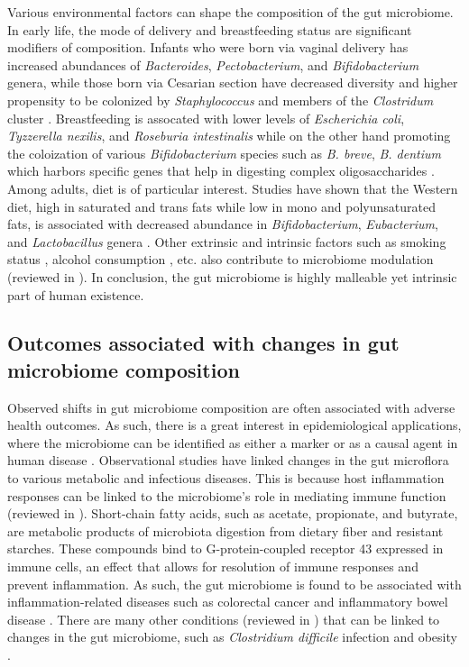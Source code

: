 Various environmental factors can shape the composition of the gut microbiome. In early life, the mode of delivery and breastfeeding status are significant modifiers of composition. Infants who were born via vaginal delivery has increased abundances of \emph{Bacteroides}, \emph{Pectobacterium}, and \emph{Bifidobacterium} genera, while those born via Cesarian section have decreased diversity and higher propensity to be colonized by \emph{Staphylococcus} and members of the \emph{Clostridum} cluster \cite{madan2016effects, kim2020delayed, stewart2018temporal}. Breastfeeding is assocated with lower levels of \emph{Escherichia coli}, \emph{Tyzzerella nexilis}, and \emph{Roseburia intestinalis} while on the other hand promoting the coloization of various \emph{Bifidobacterium} species such as \emph{B. breve}, \emph{B. dentium} which harbors specific genes that help in digesting complex oligosaccharides \cite{stewart2018temporal, vatanen2018human}. Among adults, diet is of particular interest. Studies have shown that the Western diet, high in saturated and trans fats while low in mono and polyunsaturated fats, is associated with decreased abundance in \emph{Bifidobacterium}, \emph{Eubacterium}, and \emph{Lactobacillus} genera \cite{wu2011linking}. Other extrinsic and intrinsic factors such as smoking status \cite{biedermann2013smoking}, alcohol consumption \cite{dubinkina2017links}, etc. also contribute to microbiome modulation (reviewed in \cite{schmidt2018humana}). In conclusion, the gut microbiome is highly malleable yet intrinsic part of human existence. 

\subsection{Outcomes associated with changes in gut microbiome composition}

Observed shifts in gut microbiome composition are often associated with adverse health outcomes. As such, there is a great interest in epidemiological applications, where the microbiome can be identified as either a marker or as a causal agent in human disease \cite{foxman2015use}. Observational studies have linked changes in the gut microflora to various metabolic and infectious diseases. This is because host inflammation responses can be linked to the microbiome's role in mediating immune function (reviewed in \cite{wang2020relationship}). Short-chain fatty acids, such as acetate, propionate, and butyrate, are metabolic products of microbiota digestion from dietary fiber and resistant starches. These compounds bind to G-protein-coupled receptor 43 expressed in immune cells, an effect that allows for resolution of immune responses and prevent inflammation. As such, the gut microbiome is found to be associated with inflammation-related diseases such as colorectal cancer \cite{cheng2020intestinal, yu2017metagenomica} and inflammatory bowel disease \cite{gevers2014treatmentnaive, franzosa2019gut, lloyd-price2019multiomics}. There are many other conditions (reviewed in \cite{cho2012human}) that can be linked to changes in the gut microbiome, such as \emph{Clostridium difficile} infection \cite{weingarden2014microbiota} and obesity \cite{turnbaugh2009core, aoun2020influence}.   

